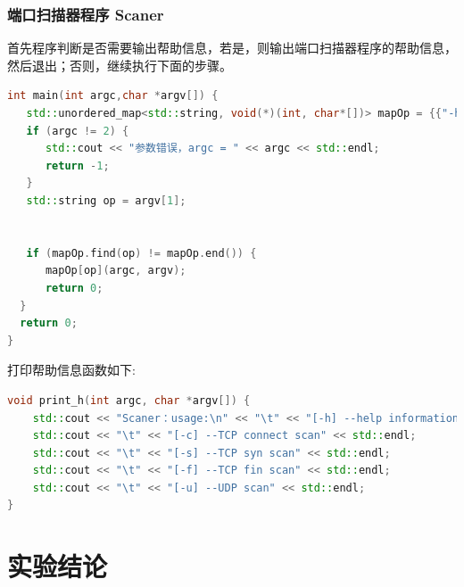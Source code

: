 \documentclass[UTF8,a4paper,10pt]{ctexart}
\begin{document}
\subsubsection{端口扫描器程序 Scaner}
首先程序判断是否需要输出帮助信息，若是，则输出端口扫描器程序的帮助信息，
然后退出；否则，继续执行下面的步骤。
\begin{lstlisting}[language = C++]
int main(int argc,char *argv[]) { 
   std::unordered_map<std::string, void(*)(int, char*[])> mapOp = {{"-h", print_h}, {"-c", print_c}, {"-s", print_s}, {"-u", print_u}, {"-f", print_f}};
   if (argc != 2) { 
      std::cout << "参数错误，argc = " << argc << std::endl;
      return -1;
   }
   std::string op = argv[1];


   if (mapOp.find(op) != mapOp.end()) {
      mapOp[op](argc, argv);
      return 0;
  }
  return 0;
}
\end{lstlisting}
打印帮助信息函数如下:
\begin{lstlisting}[language = C++]
void print_h(int argc, char *argv[]) {
    std::cout << "Scaner：usage:\n" << "\t" << "[-h] --help information " << std::endl;
    std::cout << "\t" << "[-c] --TCP connect scan" << std::endl;
    std::cout << "\t" << "[-s] --TCP syn scan" << std::endl;
    std::cout << "\t" << "[-f] --TCP fin scan" << std::endl;
    std::cout << "\t" << "[-u] --UDP scan" << std::endl;
}
\end{lstlisting}






































\section{实验结论}
\end{document}
